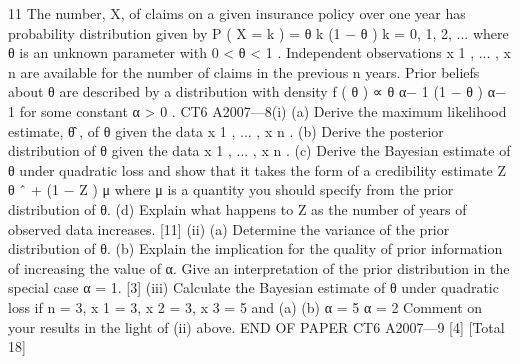 \documentclass[a4paper,12pt]{article}
\begin{document}
\begin{enumerate}

11
The number, X, of claims on a given insurance policy over one year has probability
distribution given by
P ( X = k ) = θ k (1 − θ ) k = 0, 1, 2, ...
where θ is an unknown parameter with 0 < θ < 1 .
Independent observations x 1 , ... , x n are available for the number of claims in the
previous n years. Prior beliefs about θ are described by a distribution with density
f ( θ ) ∝ θ α− 1 (1 − θ ) α− 1
for some constant α > 0 .
CT6 A2007—8(i)
(a) Derive the maximum likelihood estimate, θ̂ , of θ given the data
x 1 , ... , x n .
(b) Derive the posterior distribution of θ given the data x 1 , ... , x n .
(c) Derive the Bayesian estimate of θ under quadratic loss and show that
it takes the form of a credibility estimate
Z θ ˆ + (1 − Z ) μ
where μ is a quantity you should specify from the prior distribution of
θ.
(d)
Explain what happens to Z as the number of years of observed data
increases.
[11]
(ii)
(a) Determine the variance of the prior distribution of θ.
(b) Explain the implication for the quality of prior information of
increasing the value of α. Give an interpretation of the prior
distribution in the special case α = 1.
[3]
(iii)
Calculate the Bayesian estimate of θ under quadratic loss if n = 3,
x 1 = 3, x 2 = 3, x 3 = 5 and
(a)
(b)
α = 5
α = 2
Comment on your results in the light of (ii) above.
END OF PAPER
CT6 A2007—9
[4]
[Total 18]


\end{enumerate}
\end{document}
